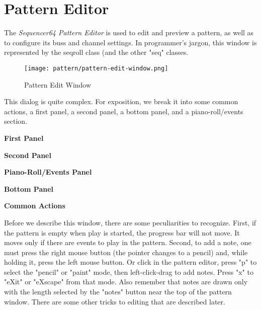 %
%

\section{Pattern Editor}
\label{sec:seq64_pattern_editor}

   The \textsl{Sequencer64 Pattern Editor} is used to edit and preview a
   pattern, as well as to configure its buss and channel settings.
   In programmer's jargon, this window is represented by the seqroll class (and
   the other "seq" classes.

\begin{figure}[H]
   \centering 
   \texttt{[image: pattern/pattern-edit-window.png]}
   \caption{Pattern Edit Window}
   \label{fig:pattern_edit_window}
\end{figure}

   This dialog is quite complex.
   For exposition, we break it into some common actions, a first panel, a
   second panel, a bottom panel, and a piano-roll/events section.

   \begin{enumber}
      \item \textbf{First Panel}
      \item \textbf{Second Panel}
      \item \textbf{Piano-Roll/Events Panel}
      \item \textbf{Bottom Panel}
      \item \textbf{Common Actions}
   \end{enumber}

   Before we describe this window, there are some peculiarities to recognize.
   First, if the pattern is empty when play is started, the progress bar will
   not move.  It moves only if there are events to play in the pattern.
   Second, to add a note, one must press the right mouse button (the pointer
   changes to a pencil) and, while holding it, press the left mouse button.  Or
   click in the pattern editor, press
   "p" to select the "pencil" or "paint" mode, then
   left-click-drag to add notes.
   Press "x" to "eXit" or "eXscape" from that mode.  Also remember
   that notes are drawn only with the length selected by the "notes" button
   near the top of the pattern window.  There are some other tricks to editing
   that are described later.

